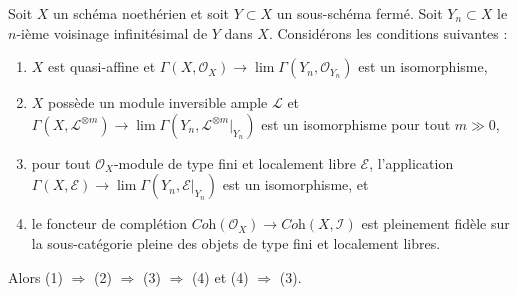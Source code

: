 \begin{lemma}
\label{lemma-completion-fully-faithful}
Soit $X$ un schéma noethérien et soit $Y \subset X$ un sous-schéma fermé.
Soit $Y_n \subset X$ le $n$-ième voisinage infinitésimal de $Y$ dans $X$.
Considérons les conditions suivantes :
\begin{enumerate}
\item $X$ est quasi-affine et
$\Gamma(X, \mathcal{O}_X) \to \lim \Gamma(Y_n, \mathcal{O}_{Y_n})$
est un isomorphisme,
\item $X$ possède un module inversible ample $\mathcal{L}$ et
$\Gamma(X, \mathcal{L}^{\otimes m}) \to
\lim \Gamma(Y_n, \mathcal{L}^{\otimes m}|_{Y_n})$
est un isomorphisme pour tout $m \gg 0$,
\item pour tout $\mathcal{O}_X$-module de type fini et localement libre
$\mathcal{E}$, l'application
$\Gamma(X, \mathcal{E}) \to \lim \Gamma(Y_n, \mathcal{E}|_{Y_n})$
est un isomorphisme, et
\item le foncteur de complétion
$\textit{Coh}(\mathcal{O}_X) \to \textit{Coh}(X, \mathcal{I})$
est pleinement fidèle sur la sous-catégorie pleine des
objets de type fini et localement libres.
\end{enumerate}
Alors (1) $\Rightarrow$ (2) $\Rightarrow$ (3) $\Rightarrow$ (4)
et (4) $\Rightarrow$ (3).
\end{lemma}

